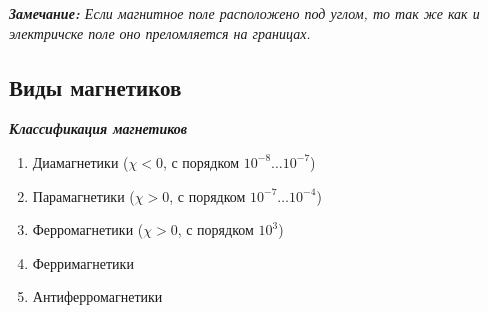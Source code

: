 \documentclass[../main.tex]{subfiles}
\begin{document}
\textit{\textbf{Замечание:} Если магнитное поле расположено под углом, то так же как и электричске поле оно преломляется на границах.}
\subsection{Виды магнетиков}

\textit{\textbf{Классификация магнетиков}}
\begin{enumerate}
    \item Диамагнетики ($\chi < 0$, с порядком $10^{-8} \ldots 10^{-7}$)
    \item Парамагнетики ($\chi > 0$, с порядком $10^{-7} \ldots 10^{-4}$)
    \item Ферромагнетики ($\chi > 0$, с порядком $10^{3}$)
    \item Ферримагнетики
    \item Антиферромагнетики
\end{enumerate}
\end{document}
